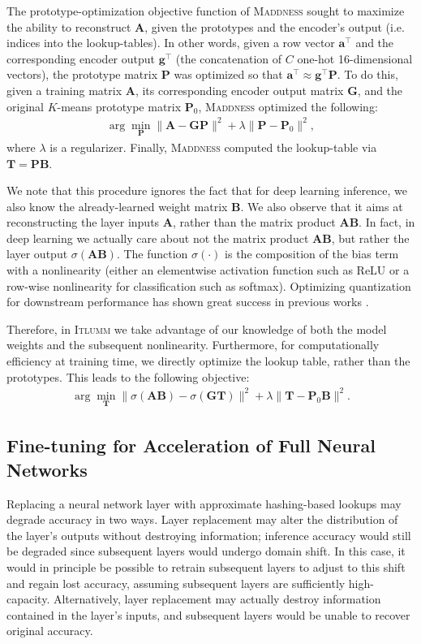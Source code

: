 \documentclass{article}
\begin{document}
The prototype-optimization objective function of \textsc{Maddness} sought to maximize the ability to reconstruct $\bm{A}$, given the prototypes and the encoder's output (i.e. indices into the lookup-tables).
In other words, given a row vector $\bm{a}^\top$ and the corresponding encoder output $\bm{g}^\top$ (the concatenation of $C$ one-hot 16-dimensional vectors),
the prototype matrix $\bm{P}$ was optimized so that $\bm{a}^\top \approx \bm{g}^\top \bm{P}$.
To do this, given a training matrix $\bm{A}$, its corresponding encoder output matrix $\bm{G}$, and the original $K$-means prototype matrix $\bm{P}_0$, \textsc{Maddness} optimized the following:
\begin{gather}
    \arg\min_{\bm{P}} \|\bm{A} - \bm{GP}\|^2 + \lambda \|\bm{P}-\bm{P}_0\|^2,
\end{gather}
where $\lambda$ is a regularizer.
Finally, \textsc{Maddness} computed the lookup-table via $\bm{T} = \bm{P}\bm{B}$.

We note that this procedure ignores the fact that for deep learning inference, we also know the already-learned weight matrix $\bm{B}$.
We also observe that it aims at reconstructing the layer inputs $\bm{A}$, rather than the matrix product $\bm{AB}$.
In fact, in deep learning we actually care about not the matrix product $\bm{AB}$, but rather the layer output $\sigma(\bm{AB})$. The function $\sigma(\cdot)$ is the composition of the bias term with a nonlinearity (either an elementwise activation function such as ReLU or a row-wise nonlinearity for classification such as softmax).
Optimizing quantization for downstream performance has shown great success in previous works \cite{guo2020accelerating,may2019downstream}.

Therefore, in \textsc{Itlumm} we take advantage of our knowledge of both the model weights and the subsequent nonlinearity.
Furthermore, for computationally efficiency at training time, we directly optimize the lookup table, rather than the prototypes.
This leads to the following objective:
\begin{align}
    \arg\min_{\bm{T}} \|\sigma(\bm{AB}) - \sigma(\bm{GT})\|^2 + \lambda \|\bm{T}-\bm{P}_0\bm{B}\|^2.
\end{align}

\subsection{Fine-tuning for Acceleration of Full Neural Networks}
\label{sec:finetuning}

Replacing a neural network layer with approximate hashing-based lookups may degrade accuracy in two ways.
Layer replacement may alter the distribution of the layer's outputs without destroying information; inference accuracy would still be degraded since subsequent layers would undergo domain shift.
In this case, it would in principle be possible to retrain subsequent layers to adjust to this shift and regain lost accuracy, assuming subsequent layers are sufficiently high-capacity.
Alternatively, layer replacement may actually destroy information contained in the layer's inputs, and subsequent layers would be unable to recover original accuracy.
\end{document}

